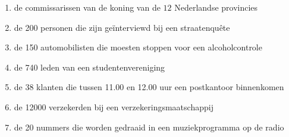 \begin{enumerate}[label=(\alph*)]
    \item de commissarissen van de koning van de $12$ Nederlandse provincies
    \item de 200 personen die zijn geïnterviewd bij een straatenquête
    \item de 150 automobilisten die moesten stoppen voor een alcoholcontrole
    \item de 740 leden van een studentenvereniging
    \item de 38 klanten die tussen 11.00 en 12.00 uur een postkantoor binnenkomen
    \item de 12000 verzekerden bij een verzekeringsmaatschappij
    \item de 20 nummers die worden gedraaid in een muziekprogramma op de radio
\end{enumerate}

